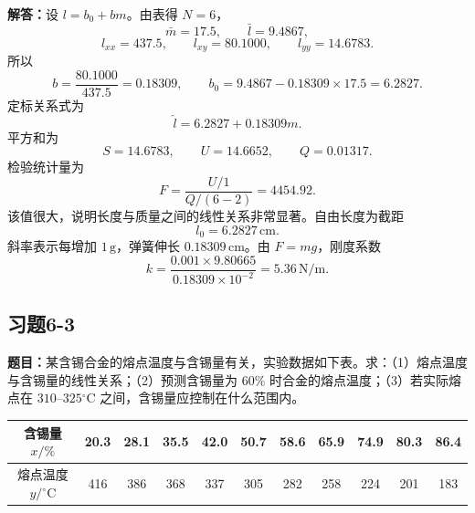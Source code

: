 \documentclass[UTF8,zihao=-4]{ctexart}
\newcommand{\problem}[1]{\subsection*{#1}}
\newcommand{\timu}{\noindent\textbf{题目：}}
\newcommand{\jieda}{\noindent\textbf{解答：}}
\begin{document}
{\jieda 设 $l=b_0+bm$。由表得 $N=6$，
\begin{equation*}
    \bar m=17.5,
    \qquad
    \bar l=9.4867,
\end{equation*}
\begin{equation*}
    l_{xx}=437.5,
    \qquad
    l_{xy}=80.1000,
    \qquad
    l_{yy}=14.6783.
\end{equation*}
所以
\begin{equation*}
    b=\frac{80.1000}{437.5}=0.18309,
    \qquad
    b_0=9.4867-0.18309\times17.5=6.2827.
\end{equation*}
定标关系式为
\begin{equation*}
    \hat l=6.2827+0.18309m.
\end{equation*}
平方和为
\begin{equation*}
    S=14.6783,
    \qquad
    U=14.6652,
    \qquad
    Q=0.01317.
\end{equation*}
检验统计量为
\begin{equation*}
    F=\frac{U/1}{Q/(6-2)}=4454.92.
\end{equation*}
该值很大，说明长度与质量之间的线性关系非常显著。自由长度为截距
\begin{equation*}
    l_0=6.2827\,\mathrm{cm}.
\end{equation*}
斜率表示每增加 $1\,\mathrm{g}$，弹簧伸长 $0.18309\,\mathrm{cm}$。由 $F=mg$，刚度系数
\begin{equation*}
    k=\frac{0.001\times9.80665}{0.18309\times10^{-2}}
    =5.36\,\mathrm{N/m}.
\end{equation*}

\newpage

\problem{习题6-3}
\timu 某含锡合金的熔点温度与含锡量有关，实验数据如下表。求：（1）熔点温度与含锡量的线性关系；（2）预测含锡量为 $60\%$ 时合金的熔点温度；（3）若实际熔点在 $310$--$325{}^\circ\mathrm{C}$ 之间，含锡量应控制在什么范围内。

\begin{center}
\scriptsize
\setlength{\tabcolsep}{4pt}
\begin{tabular}{c|cccccccccc}
\toprule
含锡量 $x/\%$ & 20.3 & 28.1 & 35.5 & 42.0 & 50.7 & 58.6 & 65.9 & 74.9 & 80.3 & 86.4\\
\midrule
熔点温度 $y/{}^\circ\mathrm{C}$ & 416 & 386 & 368 & 337 & 305 & 282 & 258 & 224 & 201 & 183\\
\bottomrule
\end{tabular}
\end{center}

}
\end{document}

